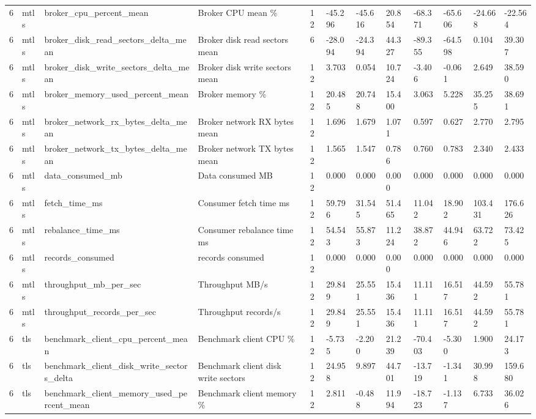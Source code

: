 \begin{longtable}{llllllllllll}
6 & mtls & broker\_cpu\_percent\_mean & Broker CPU mean \% & 12 & -45.296 & -45.616 & 20.854 & -68.371 & -65.606 & -24.668 & -22.564 \\
6 & mtls & broker\_disk\_read\_sectors\_delta\_mean & Broker disk read sectors mean & 6 & -28.094 & -24.394 & 44.327 & -89.355 & -64.598 & 0.104 & 39.307 \\
6 & mtls & broker\_disk\_write\_sectors\_delta\_mean & Broker disk write sectors mean & 12 & 3.703 & 0.054 & 10.724 & -3.406 & -0.061 & 2.649 & 38.590 \\
6 & mtls & broker\_memory\_used\_percent\_mean & Broker memory \% & 12 & 20.485 & 20.748 & 15.400 & 3.063 & 5.228 & 35.255 & 38.691 \\
6 & mtls & broker\_network\_rx\_bytes\_delta\_mean & Broker network RX bytes mean & 12 & 1.696 & 1.679 & 1.071 & 0.597 & 0.627 & 2.770 & 2.795 \\
6 & mtls & broker\_network\_tx\_bytes\_delta\_mean & Broker network TX bytes mean & 12 & 1.565 & 1.547 & 0.786 & 0.760 & 0.783 & 2.340 & 2.433 \\
6 & mtls & data\_consumed\_mb & Data consumed MB & 12 & 0.000 & 0.000 & 0.000 & 0.000 & 0.000 & 0.000 & 0.000 \\
6 & mtls & fetch\_time\_ms & Consumer fetch time ms & 12 & 59.796 & 31.545 & 51.465 & 11.042 & 18.902 & 103.431 & 176.626 \\
6 & mtls & rebalance\_time\_ms & Consumer rebalance time ms & 12 & 54.543 & 55.873 & 11.224 & 38.872 & 44.946 & 63.722 & 73.425 \\
6 & mtls & records\_consumed & records consumed & 12 & 0.000 & 0.000 & 0.000 & 0.000 & 0.000 & 0.000 & 0.000 \\
6 & mtls & throughput\_mb\_per\_sec & Throughput MB/s & 12 & 29.849 & 25.551 & 15.436 & 11.111 & 16.517 & 44.592 & 55.781 \\
6 & mtls & throughput\_records\_per\_sec & Throughput records/s & 12 & 29.849 & 25.551 & 15.436 & 11.111 & 16.517 & 44.592 & 55.781 \\
6 & tls & benchmark\_client\_cpu\_percent\_mean & Benchmark client CPU \% & 12 & -5.735 & -2.200 & 21.239 & -70.403 & -5.300 & 1.900 & 24.173 \\
6 & tls & benchmark\_client\_disk\_write\_sectors\_delta & Benchmark client disk write sectors & 12 & 24.958 & 9.897 & 44.701 & -13.719 & -1.341 & 30.998 & 159.680 \\
6 & tls & benchmark\_client\_memory\_used\_percent\_mean & Benchmark client memory \% & 12 & 2.811 & -0.488 & 11.994 & -18.723 & -1.137 & 6.733 & 36.026 \\

\end{longtable}
